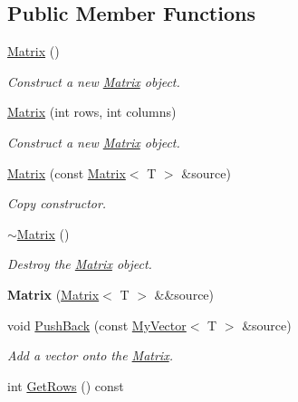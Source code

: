 \subsection*{Public Member Functions}
\begin{DoxyCompactItemize}
\item 
\mbox{\hyperlink{class_matrix_a9d567e3a121b1be0c3f9c461cab524fe}{Matrix}} ()
\begin{DoxyCompactList}\small\item\em Construct a new \mbox{\hyperlink{class_matrix}{Matrix}} object. \end{DoxyCompactList}\item 
\mbox{\hyperlink{class_matrix_a44eb4cf3a243fe027112d1ace474ead9}{Matrix}} (int rows, int columns)
\begin{DoxyCompactList}\small\item\em Construct a new \mbox{\hyperlink{class_matrix}{Matrix}} object. \end{DoxyCompactList}\item 
\mbox{\hyperlink{class_matrix_abc1e84ee28720ecc8a6807bb3f09f43e}{Matrix}} (const \mbox{\hyperlink{class_matrix}{Matrix}}$<$ T $>$ \&source)
\begin{DoxyCompactList}\small\item\em Copy constructor. \end{DoxyCompactList}\item 
\mbox{\hyperlink{class_matrix_a91aa704de674203e96aece9e1955ccd3}{$\sim$\+Matrix}} ()
\begin{DoxyCompactList}\small\item\em Destroy the \mbox{\hyperlink{class_matrix}{Matrix}} object. \end{DoxyCompactList}\item 
\mbox{\label{class_matrix_a0632d6b00522f3ce31684c07cb258440}} 
{\bfseries Matrix} (\mbox{\hyperlink{class_matrix}{Matrix}}$<$ T $>$ \&\&source)
\item 
void \mbox{\hyperlink{class_matrix_af61aaa671b6bd354b27fb3aabbb65a9d}{Push\+Back}} (const \mbox{\hyperlink{class_my_vector}{My\+Vector}}$<$ T $>$ \&source)
\begin{DoxyCompactList}\small\item\em Add a vector onto the \mbox{\hyperlink{class_matrix}{Matrix}}. \end{DoxyCompactList}\item 
int \mbox{\hyperlink{class_matrix_aa665db4bc173a7bb4ec3f9da2676dfa6}{Get\+Rows}} () const

\end{DoxyCompactItemize}
